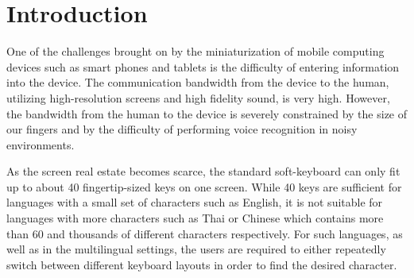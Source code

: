 \documentclass{sigchi}
\begin{document}



\newtheorem{theorem}{Theorem}   
\newtheorem{lemma}[theorem]{Lemma}

\vfill

\section{Introduction}

One of the challenges brought on by the miniaturization of mobile
computing devices such as smart phones and tablets is the difficulty of
entering information into the device. The communication bandwidth from
the device to the human, utilizing high-resolution screens and high
fidelity sound, is very high. However, the bandwidth from the human to
the device is severely constrained by the size of our fingers and by
the difficulty of performing voice recognition in noisy environments.

As the screen real estate becomes scarce, the standard soft-keyboard
can only fit up to about 40 fingertip-sized keys on one screen. While
40 keys are sufficient for languages with a small set of characters
such as English, it is not suitable for languages with more characters
such as Thai or Chinese which contains more than 60 and thousands of
different characters respectively. For such languages, as well as in
the multilingual settings, the users are required to either repeatedly
switch between different keyboard layouts in order to find the desired
character.
\end{document}
